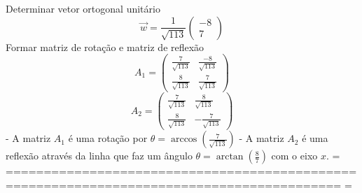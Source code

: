 Determinar vetor ortogonal unitário
\[
\vec{w} = \frac{1}{\sqrt{113}} \begin{pmatrix} -8 \\ 7 \end{pmatrix}
\]
Formar matriz de rotação e matriz de reflexão
\[
A_1 = \left(\begin{array}{cc} \frac{7}{\sqrt{113}} & \frac{-8}{\sqrt{113}} \\ \frac{8}{\sqrt{113}} & \frac{7}{\sqrt{113}} \end{array}\right)
\]
\[
A_2 = \left(\begin{array}{cc} \frac{7}{\sqrt{113}} & \frac{8}{\sqrt{113}} \\ \frac{8}{\sqrt{113}} & -\frac{7}{\sqrt{113}} \end{array}\right)
\]
- A matriz \(A_1\) é uma rotação por \(\theta = \arccos\left(\frac{7}{\sqrt{113}}\right)\)
- A matriz \(A_2\) é uma reflexão através da linha que faz um ângulo \(\theta = \arctan\left(\frac{8}{7}\right)\) com o eixo \(x\).
=
==========================================================================================
=



